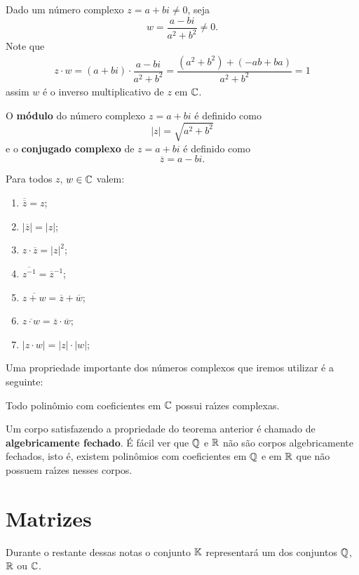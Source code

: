 Dado um n\'umero complexo $z = a + bi \ne 0$, seja
\[
	w = \dfrac{a - bi}{a^2 + b^2} \ne 0.
\]
Note que
\begin{align*}
	z\cdot w = (a + bi)\cdot \dfrac{a - bi}{a^2 + b^2} = \dfrac{(a^2 + b^2) + (-ab + ba)}{a^2 + b^2} = 1
\end{align*}
assim $w$ \'e o inverso multiplicativo de $z$ em $\mathbb{C}$.

O \textbf{m\'odulo} do n\'umero complexo $z = a + bi$ \'e definido como
\[
	|z| = \sqrt{a^2 + b^2}
\]
e o \textbf{conjugado complexo} de $z = a + bi$ \'e definido como
\[
	\overline{z} = a - bi.
\]

\begin{proposicao}
	Para todos $z$, $w \in \mathbb{C}$ valem:
	\begin{enumerate}[label={\roman*})]
		\item $\overline{\overline{z}} = z$;
		\item $|\overline{z}| = |z|$;
		\item $z\cdot\overline{z} = |z|^2$;
		\item $\overline{z^{-1}} = \overline{z}^{-1}$;
		\item $\overline{z + w} = \overline{z} + \overline{w}$;
		\item $\overline{z \cdot w} = \overline{z} \cdot \overline{w}$;
		\item $|z \cdot w| = |z| \cdot |w|$;
	\end{enumerate}
\end{proposicao}

Uma propriedade importante dos n\'umeros complexos que iremos utilizar \'e a seguinte:
\begin{teorema}
	Todo polin\^omio com coeficientes em $\mathbb{C}$ possui ra{\'\i}zes complexas.
\end{teorema}

Um corpo satisfazendo a propriedade do teorema anterior \'e chamado de \textbf{algebricamente fechado}. \'E f\'acil ver que $\mathbb{Q}$ e $\mathbb{R}$ n\~ao s\~ao corpos algebricamente fechados, isto \'e, existem polin\^omios com coeficientes em $\mathbb{Q}$ e em $\mathbb{R}$ que n\~ao possuem ra{\'\i}zes nesses corpos.

\section{Matrizes}

Durante o restante dessas notas o conjunto $\mathbb{K}$ representará um dos conjuntos $\mathbb{Q}$, $\mathbb{R}$ ou $\mathbb{C}$.

